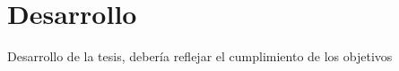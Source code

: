 \chapter{Desarrollo}
\label{chap:desarrollo}

Desarrollo de la tesis, debería reflejar el cumplimiento de los objetivos
\newpage

